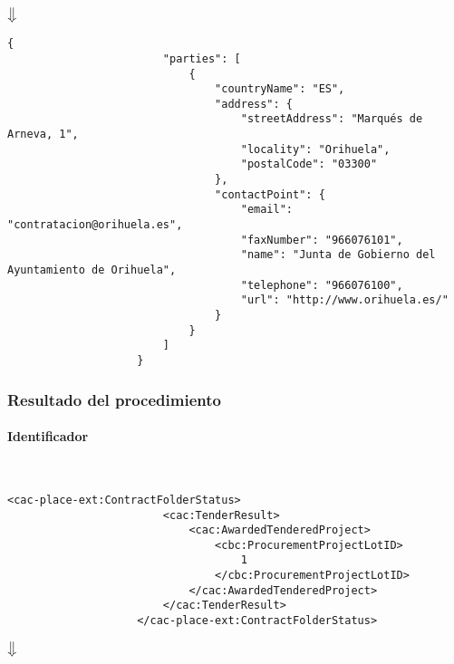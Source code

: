                 \begin{center}
                    $\big\Downarrow$
                \end{center}
\newpage
                \begin{lstlisting}[language=lJSON]
                    {
                        "parties": [
                            {
                                "countryName": "ES",
                                "address": {
                                    "streetAddress": "Marqués de Arneva, 1",
                                    "locality": "Orihuela",
                                    "postalCode": "03300"
                                },
                                "contactPoint": {
                                    "email": "contratacion@orihuela.es",
                                    "faxNumber": "966076101",
                                    "name": "Junta de Gobierno del Ayuntamiento de Orihuela",
                                    "telephone": "966076100",
                                    "url": "http://www.orihuela.es/"
                                }
                            }
                        ]
                    }
                \end{lstlisting}
            
        \subsubsection{Resultado del procedimiento}
            \paragraph{Identificador} \mbox{}\\
                \begin{lstlisting}[language=lXML]
                    <cac-place-ext:ContractFolderStatus>
                        <cac:TenderResult>
                            <cac:AwardedTenderedProject>
                                <cbc:ProcurementProjectLotID>
                                    1
                                </cbc:ProcurementProjectLotID>
                            </cac:AwardedTenderedProject>
                        </cac:TenderResult>
                    </cac-place-ext:ContractFolderStatus>
                \end{lstlisting}
                
                \begin{center}
                    $\big\Downarrow$
                \end{center}
                
